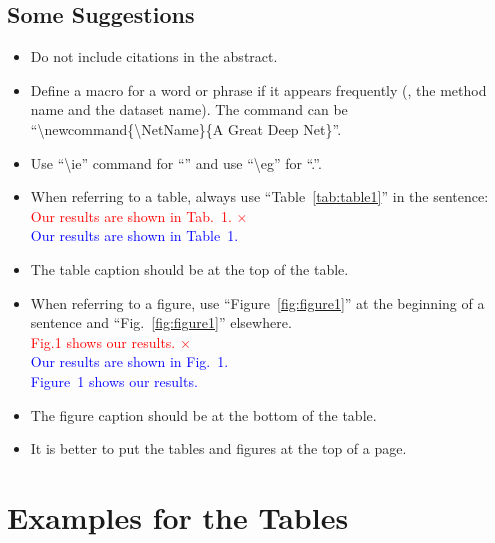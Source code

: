 \documentclass[10pt,twocolumn,letterpaper]{article}
\newcommand{\correct}[1]{\textcolor{blue}{#1 \checkmark}}
\newcommand{\wrong}[1]{\textcolor{red}{#1 $\times$}}
\begin{document}
\subsection{Some Suggestions}
\begin{itemize}
    \item Do not include citations in the abstract.
    \item Define a macro for a word or phrase if it appears frequently (\eg, the method name and the dataset name). The command can be\\``\textbackslash newcommand\{\textbackslash NetName\}\{A Great Deep Net\}''.
    \item Use ``\textbackslash ie'' command for ``\ie'' and use ``\textbackslash eg'' for ``\eg.''.
    \item When referring to a table, always use ``Table~\ref{tab:table1}'' in the sentence:\\
        \wrong{Our results are shown in Tab.~1.}\\
        \correct{Our results are shown in Table~1.}

    \item The table caption should be at the top of the table.
    \item When referring to a figure, use ``Figure~\ref{fig:figure1}'' at the beginning of a sentence and ``Fig.~\ref{fig:figure1}'' elsewhere.\\
        \wrong{Fig.1 shows our results.}\\
        \correct{Our results are shown in Fig.~1.}\\
        \correct{Figure~1 shows our results.}
    \item The figure caption should be at the bottom of the table.
    \item It is better to put the tables and figures at the top of a page.
\end{itemize}

\clearpage

\section{Examples for the Tables}

\end{document}
